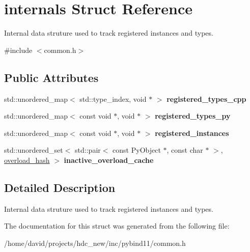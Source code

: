 \hypertarget{structinternals}{}\section{internals Struct Reference}
\label{structinternals}


Internal data struture used to track registered instances and types.  




{\ttfamily \#include $<$common.\+h$>$}

\subsection*{Public Attributes}
\begin{DoxyCompactItemize}
\item 
std\+::unordered\+\_\+map$<$ std\+::type\+\_\+index, void $\ast$ $>$ {\bfseries registered\+\_\+types\+\_\+cpp}\hypertarget{structinternals_a2b4726741668ea9e472a9db0e27fd29e}{}\label{structinternals_a2b4726741668ea9e472a9db0e27fd29e}

\item 
std\+::unordered\+\_\+map$<$ const void $\ast$, void $\ast$ $>$ {\bfseries registered\+\_\+types\+\_\+py}\hypertarget{structinternals_a3947b20a70713c31752e09728d5c3e82}{}\label{structinternals_a3947b20a70713c31752e09728d5c3e82}

\item 
std\+::unordered\+\_\+map$<$ const void $\ast$, void $\ast$ $>$ {\bfseries registered\+\_\+instances}\hypertarget{structinternals_a2fc7d2613e587ab33def3b598bc0f9ed}{}\label{structinternals_a2fc7d2613e587ab33def3b598bc0f9ed}

\item 
std\+::unordered\+\_\+set$<$ std\+::pair$<$ const Py\+Object $\ast$, const char $\ast$ $>$, \hyperlink{structoverload__hash}{overload\+\_\+hash} $>$ {\bfseries inactive\+\_\+overload\+\_\+cache}\hypertarget{structinternals_a46a3096ec216e6229e944bbc6cff7b3d}{}\label{structinternals_a46a3096ec216e6229e944bbc6cff7b3d}

\end{DoxyCompactItemize}


\subsection{Detailed Description}
Internal data struture used to track registered instances and types. 

The documentation for this struct was generated from the following file\+:\begin{DoxyCompactItemize}
\item 
/home/david/projects/hdc\+\_\+new/inc/pybind11/common.\+h\end{DoxyCompactItemize}
